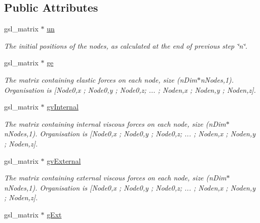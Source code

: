 \subsection*{Public Attributes}
\begin{DoxyCompactItemize}
\item 
\hypertarget{classNewtonRaphsonSolver_a89a6e2f583c785b77b967e6f0e9f5893}{}gsl\+\_\+matrix $\ast$ \hyperlink{classNewtonRaphsonSolver_a89a6e2f583c785b77b967e6f0e9f5893}{un}\label{classNewtonRaphsonSolver_a89a6e2f583c785b77b967e6f0e9f5893}

\begin{DoxyCompactList}\small\item\em The initial positions of the nodes, as calculated at the end of previous step \char`\"{}n\char`\"{}. \end{DoxyCompactList}\item 
\hypertarget{classNewtonRaphsonSolver_a3b2a215e49d3c1d6d12eb7c8c73e9ff6}{}gsl\+\_\+matrix $\ast$ \hyperlink{classNewtonRaphsonSolver_a3b2a215e49d3c1d6d12eb7c8c73e9ff6}{ge}\label{classNewtonRaphsonSolver_a3b2a215e49d3c1d6d12eb7c8c73e9ff6}

\begin{DoxyCompactList}\small\item\em The matrix containing elastic forces on each node, size (n\+Dim$\ast$n\+Nodes,1). Organisation is \mbox{[}Node0,x ; Node0,y ; Node0,z; ... ; Noden,x ; Noden,y ; Noden,z\mbox{]}. \end{DoxyCompactList}\item 
\hypertarget{classNewtonRaphsonSolver_a79fd12919ceb329bc177f16f3ce897b6}{}gsl\+\_\+matrix $\ast$ \hyperlink{classNewtonRaphsonSolver_a79fd12919ceb329bc177f16f3ce897b6}{gv\+Internal}\label{classNewtonRaphsonSolver_a79fd12919ceb329bc177f16f3ce897b6}

\begin{DoxyCompactList}\small\item\em The matrix containing internal viscous forces on each node, size (n\+Dim$\ast$n\+Nodes,1). Organisation is \mbox{[}Node0,x ; Node0,y ; Node0,z; ... ; Noden,x ; Noden,y ; Noden,z\mbox{]}. \end{DoxyCompactList}\item 
\hypertarget{classNewtonRaphsonSolver_a80160d7bfb04a39e3b8910b68f66aa6d}{}gsl\+\_\+matrix $\ast$ \hyperlink{classNewtonRaphsonSolver_a80160d7bfb04a39e3b8910b68f66aa6d}{gv\+External}\label{classNewtonRaphsonSolver_a80160d7bfb04a39e3b8910b68f66aa6d}

\begin{DoxyCompactList}\small\item\em The matrix containing external viscous forces on each node, size (n\+Dim$\ast$n\+Nodes,1). Organisation is \mbox{[}Node0,x ; Node0,y ; Node0,z; ... ; Noden,x ; Noden,y ; Noden,z\mbox{]}. \end{DoxyCompactList}\item 
\hypertarget{classNewtonRaphsonSolver_afee5ceb54c8d439c1044ad3997d079ea}{}gsl\+\_\+matrix $\ast$ \hyperlink{classNewtonRaphsonSolver_afee5ceb54c8d439c1044ad3997d079ea}{g\+Ext}\label{classNewtonRaphsonSolver_afee5ceb54c8d439c1044ad3997d079ea}


\end{DoxyCompactItemize}

